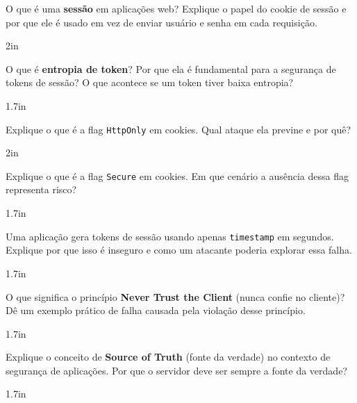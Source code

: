 \documentclass[12pt]{exam}
\begin{document}
\begin{questions}

\question O que é uma \textbf{sessão} em aplicações web? Explique o papel do cookie de sessão e por que ele é usado em vez de enviar usuário e senha em cada requisição.
\begin{solutionbox}{2in}
\end{solutionbox}

\question O que é \textbf{entropia de token}? Por que ela é fundamental para a segurança de tokens de sessão? O que acontece se um token tiver baixa entropia?
\begin{solutionbox}{1.7in}
\end{solutionbox}

\question Explique o que é a flag \texttt{HttpOnly} em cookies. Qual ataque ela previne e por quê?
\begin{solutionbox}{2in}
\end{solutionbox}

\question Explique o que é a flag \texttt{Secure} em cookies. Em que cenário a ausência dessa flag representa risco?
\begin{solutionbox}{1.7in}
\end{solutionbox}

\question Uma aplicação gera tokens de sessão usando apenas \texttt{timestamp} em segundos. Explique por que isso é inseguro e como um atacante poderia explorar essa falha.
\begin{solutionbox}{1.7in}
\end{solutionbox}



\question O que significa o princípio \textbf{Never Trust the Client} (nunca confie no cliente)? Dê um exemplo prático de falha causada pela violação desse princípio.
\begin{solutionbox}{1.7in}
\end{solutionbox}

\question Explique o conceito de \textbf{Source of Truth} (fonte da verdade) no contexto de segurança de aplicações. Por que o servidor deve ser sempre a fonte da verdade?
\begin{solutionbox}{1.7in}
\end{solutionbox}


\end{questions}
\end{document}
